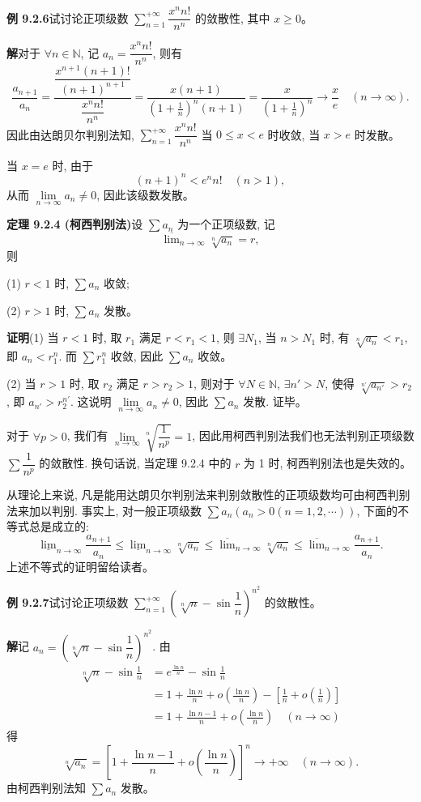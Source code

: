 \documentclass[UTF8,12pt,a4paper,fontset=fandol]{ctexart}
\begin{document}
\noindent\textbf{例 9.2.6}\quad 试讨论正项级数 $\sum\limits_{n=1}^{+\infty}\dfrac{x^n n!}{n^n}$ 的敛散性, 其中 $x\geq0$。

\noindent\textbf{解}\quad 对于 $\forall n\in\mathbb{N}$, 记 $a_n=\dfrac{x^n n!}{n^n}$, 则有
\[
  \frac{a_{n+1}}{a_n}
  =\frac{\dfrac{x^{n+1}(n+1)!}{(n+1)^{n+1}}}{\dfrac{x^n n!}{n^n}}
  =\frac{x(n+1)}{\left(1+\frac1n\right)^n(n+1)}
  =\frac{x}{\left(1+\frac1n\right)^n}\to\frac{x}{e}\quad(n\to\infty).
\]
因此由达朗贝尔判别法知, $\sum\limits_{n=1}^{+\infty}\dfrac{x^n n!}{n^n}$ 当 $0\leq x<e$ 时收敛, 当 $x>e$ 时发散。

当 $x=e$ 时, 由于
\[
  (n+1)^n<e^n n!\quad(n>1),
\]
从而 $\lim\limits_{n\to\infty}a_n\neq0$, 因此该级数发散。

\noindent\textbf{定理 9.2.4 (柯西判别法)}\quad 设 $\sum a_n$ 为一个正项级数, 记
\[
  \overline{\lim}_{n\to\infty}\sqrt[n]{a_n}=r,
\]
则

(1) $r<1$ 时, $\sum a_n$ 收敛;

(2) $r>1$ 时, $\sum a_n$ 发散。

\noindent\textbf{证明}\quad (1) 当 $r<1$ 时, 取 $r_1$ 满足 $r<r_1<1$, 则 $\exists N_1$, 当 $n>N_1$ 时, 有 $\sqrt[n]{a_n}<r_1$, 即 $a_n<r_1^n$. 而 $\sum r_1^n$ 收敛, 因此 $\sum a_n$ 收敛。

(2) 当 $r>1$ 时, 取 $r_2$ 满足 $r>r_2>1$, 则对于 $\forall N\in\mathbb{N}$, $\exists n'>N$, 使得 $\sqrt[n']{a_{n'}}>r_2$, 即 $a_{n'}>r_2^{n'}$. 这说明 $\lim\limits_{n\to\infty}a_n\neq0$, 因此 $\sum a_n$ 发散. 证毕。

对于 $\forall p>0$, 我们有 $\lim\limits_{n\to\infty}\sqrt[n]{\dfrac1{n^p}}=1$, 因此用柯西判别法我们也无法判别正项级数 $\sum\dfrac1{n^p}$ 的敛散性. 换句话说, 当定理 9.2.4 中的 $r$ 为 1 时, 柯西判别法也是失效的。

从理论上来说, 凡是能用达朗贝尔判别法来判别敛散性的正项级数均可由柯西判别法来加以判别. 事实上, 对一般正项级数 $\sum a_n(a_n>0(n=1,2,\cdots))$, 下面的不等式总是成立的:
\[
  \underline{\lim}_{n\to\infty}\frac{a_{n+1}}{a_n}
  \leq \underline{\lim}_{n\to\infty}\sqrt[n]{a_n}
  \leq \overline{\lim}_{n\to\infty}\sqrt[n]{a_n}
  \leq \overline{\lim}_{n\to\infty}\frac{a_{n+1}}{a_n}.
\]
上述不等式的证明留给读者。

\noindent\textbf{例 9.2.7}\quad 试讨论正项级数 $\sum\limits_{n=1}^{+\infty}\left(\sqrt[n]{n}-\sin\dfrac1n\right)^{n^2}$ 的敛散性。

\noindent\textbf{解}\quad 记 $a_n=\left(\sqrt[n]{n}-\sin\dfrac1n\right)^{n^2}$. 由
\[
\begin{aligned}
  \sqrt[n]{n}-\sin\frac1n
  &=e^{\frac{\ln n}{n}}-\sin\frac1n\\
  &=1+\frac{\ln n}{n}+o\left(\frac{\ln n}{n}\right)-\left[\frac1n+o\left(\frac1n\right)\right]\\
  &=1+\frac{\ln n-1}{n}+o\left(\frac{\ln n}{n}\right)\quad(n\to\infty)
\end{aligned}
\]
得
\[
  \sqrt[n]{a_n}=\left[1+\frac{\ln n-1}{n}+o\left(\frac{\ln n}{n}\right)\right]^n\to+\infty\quad(n\to\infty).
\]
由柯西判别法知 $\sum a_n$ 发散。
\end{document}
